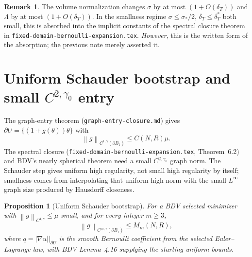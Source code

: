 \documentclass[11pt]{article}
\newtheorem{proposition}[theorem]{Proposition}
\theoremstyle{definition}
\newtheorem{remark}[theorem]{Remark}
\newcommand{\norm}[1]{\left\|#1\right\|}
\newcommand{\abs}[1]{\left|#1\right|}
\begin{document}
\begin{remark}
The volume normalization changes $\sigma$ by at most $(1+O(\delta_T))$ and
$\Lambda$ by at most $(1+O(\delta_T))$. In the smallness regime
$\sigma\le\sigma_*/2$, $\delta_T\le\delta_T^*$ both small, this is absorbed
into the implicit constants of the spectral closure theorem in
\texttt{fixed-domain-bernoulli-expansion.tex}. \emph{However}, this is the
written form of the absorption; the previous note merely asserted it.
\end{remark}

\section{Uniform Schauder bootstrap and small $C^{2,\gamma_0}$ entry}\label{sec:bootstrap}

The graph-entry theorem (\texttt{graph-entry-closure.md}) gives
$\partial U=\{(1+g(\theta))\theta\}$ with
\[
\norm{g}_{C^{1,\gamma}(\partial B_1)}\le C(N,R)\mu.
\]
The spectral closure (\texttt{fixed-domain-bernoulli-expansion.tex},
Theorem~6.2) and BDV's nearly spherical theorem need a small
$C^{2,\gamma_0}$ graph norm. The Schauder step gives uniform high regularity,
not small high regularity by itself; smallness comes from interpolating that
uniform high norm with the small $L^\infty$ graph size produced by Hausdorff
closeness.

\begin{proposition}[Uniform Schauder bootstrap]\label{prop:schauder}
For a BDV selected minimizer with $\norm{g}_{C^{1,\gamma}}\le\mu$ small,
and for every integer $m\ge3$,
\[
\norm{g}_{C^{m,\gamma}(\partial B_1)}
\le M_m(N,R),
\]
where $q=\abs{\nabla u}\big|_{\partial U}$ is the smooth Bernoulli coefficient
from the selected Euler--Lagrange law, with BDV Lemma~4.16 supplying the
starting uniform bounds.
\end{proposition}
\end{document}
